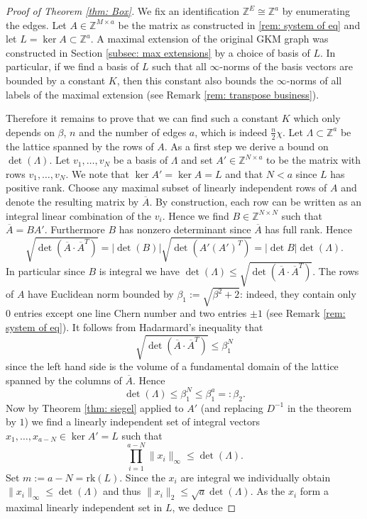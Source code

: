 \documentclass[12pt,a4paper]{amsart}
\newcommand{\rk}{\mathrm{rk}}
\newcommand{\ZZ}{\mathbb{Z}}
\theoremstyle{plain}
\theoremstyle{definition}
\begin{document}
\begin{proof}[Proof of Theorem \ref{thm: Box}]
We fix an identification $\ZZ^{E}\cong \ZZ^a$ by enumerating the edges. Let $A\in
\ZZ^{M\times a}$ be the matrix as constructed in \ref{rem: system of eq} and let $L=\ker
A\subset \ZZ^a$. A maximal extension of the original GKM graph was constructed in Section
\ref{subsec: max extensions} by a choice of basis of $L$. In particular, if we find a
basis of $L$ such that all $\infty$-norms of the basis vectors are bounded by a constant
$K$, then this constant also bounds the $\infty$-norms of all labels of the maximal
extension (see Remark \ref{rem: transpose business}). 

Therefore it remains to prove that we can find such a constant $K$ which only depends on
$\beta$, $n$ and the number of edges $a$, which is indeed $\frac{n}{2}\chi$. Let
$\Lambda\subset \ZZ^a$ be the lattice spanned by the rows of $A$. As a first step we
derive a bound on $\det(\Lambda)$. Let $v_1,\ldots,v_N$ be a basis of $\Lambda$ and set
$A'\in \ZZ^{N\times a}$ to be the matrix with rows $v_1,\ldots,v_N$. We note that $\ker
A'=\ker A=L$ and that $N< a$ since $L$ has positive rank. Choose any maximal subset of
linearly independent rows of $A$ and denote the resulting matrix by $\overline{A}$. By
construction, each row can be written as an integral linear combination of the $v_i$.
Hence we find $B\in \ZZ^{N \times N}$ such that $\overline{A} = B A'$. Furthermore $B$ has
nonzero determinant since $\overline{A}$ has full rank. Hence \[\sqrt{\det(
\overline{A}\cdot\overline{A}^T)}=|\det(B)|\sqrt{\det(A'(A')^T)}=|\det B| \det(\Lambda).\]
In particular since $B$ is integral we have $\det(\Lambda)\leq \sqrt{\det(
\overline{A}\cdot\overline{A}^T)}$. The rows of $A$ have Euclidean norm bounded by
$\beta_1:=\sqrt{\beta^2+2}$: indeed, they contain only $0$ entries except one line Chern
number and two entries $\pm 1$ (see Remark \ref{rem: system of eq}). It follows from
Hadarmard's inequality \cite[Corollary 7.8.3]{MR2978290} that
$$\sqrt{\det( \overline{A}\cdot\overline{A}^T)}\leq \beta_1^N$$ since the left hand side
is the volume of a fundamental domain of the lattice spanned by the columns of
$\overline{A}$.  Hence
\[\det(\Lambda) \leq \beta_1^N\leq \beta_1^a=:\beta_2.\]
Now by Theorem \ref{thm: siegel} applied to $A'$ (and replacing $D^{-1}$ in the theorem by $1$) we find a linearly independent set of integral vectors $x_{1},\ldots,x_{a-N}\in \ker A'=L$ such that
\[\prod_{i=1}^{a-N} \|x_i\|_\infty\leq \det(\Lambda).\]
Set $m:= a-N=\rk (L)$. Since the $x_i$ are integral we individually obtain $\|x_i\|_\infty\leq \det(\Lambda)$ and thus $\|x_i\|_2\leq \sqrt{a}\det(\Lambda)$. As the $x_i$ form a maximal linearly independent set in $L$, we deduce

\end{proof}
\end{document}
